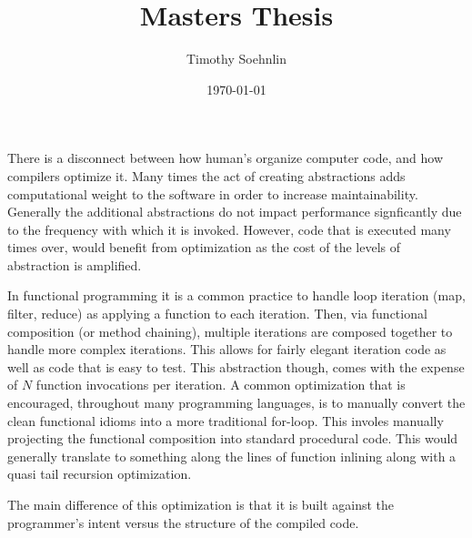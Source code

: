 \documentclass{article}
\title{Masters Thesis}
\author{Timothy Soehnlin}
\date{\today}
\begin{document}
\maketitle

There is a disconnect between how human's organize computer code, and how compilers optimize it.  Many times the act of creating abstractions adds computational weight to the software in order to increase maintainability.  Generally the additional abstractions do not impact performance signficantly due to the frequency with which it is invoked.  However, code that is executed many times over, would benefit from optimization as the cost of the levels of abstraction is amplified.  

In functional programming it is a common practice to handle loop iteration (map, filter, reduce) as applying a function to each iteration.  Then, via functional composition (or method chaining), multiple iterations are composed together to handle more complex iterations.  This allows for fairly elegant iteration code as well as code that is easy to test.  This abstraction though, comes with the expense of $N$ function invocations per iteration.  A common optimization that is encouraged, throughout many programming languages, is to manually convert the clean functional idioms into a more traditional for-loop.  This involes manually projecting the functional composition into standard procedural code.  This would generally translate to something along the lines of function inlining along with a quasi tail recursion optimization.  

The main difference of this optimization is that it is built against the programmer's intent versus the structure of the compiled code.  
\end{document}
